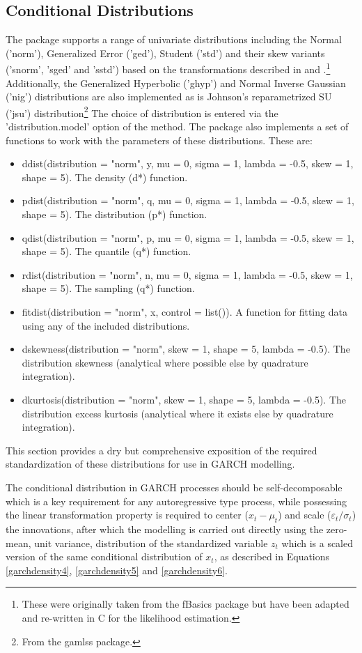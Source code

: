 \subsection{Conditional Distributions}\label{section:distributions}
The \verb@rugarch@ package supports a range of univariate distributions
including the Normal ('norm'), Generalized Error ('ged'), Student ('std')
and their skew variants ('snorm', 'sged' and 'sstd') based on the transformations
described in \citet{Fernandez1} and \citet{Ferreira1}.\footnote{These were
originally taken from the fBasics package  but have been adapted and re-written
in C for the likelihood estimation.} Additionally, the Generalized Hyperbolic
('ghyp') and Normal Inverse Gaussian ('nig') distributions are also implemented
as is Johnson's reparametrized SU ('jsu') distribution\footnote{From the
gamlss package.} The choice of distribution is entered via the
'distribution.model' option of the \verb@ugarchspec@ method. The package also
implements a set of functions to work with the parameters of these distributions.
These are:
\begin{itemize}
\item ddist(distribution = "norm", y, mu = 0, sigma = 1, lambda = -0.5, skew = 1, shape = 5). The density (d*) function.
\item pdist(distribution = "norm", q, mu = 0, sigma = 1, lambda = -0.5, skew = 1, shape = 5). The distribution (p*) function.
\item qdist(distribution = "norm", p, mu = 0, sigma = 1, lambda = -0.5, skew = 1, shape = 5). The quantile (q*) function.
\item rdist(distribution = "norm", n, mu = 0, sigma = 1, lambda = -0.5, skew = 1, shape = 5). The sampling (q*) function.
\item fitdist(distribution = "norm", x, control = list()). A function for fitting data using any of the included distributions.
\item dskewness(distribution = "norm", skew = 1, shape = 5, lambda = -0.5). The distribution skewness (analytical where possible else by quadrature integration).
\item dkurtosis(distribution = "norm", skew = 1, shape = 5, lambda = -0.5). The distribution excess kurtosis (analytical where it exists else by quadrature integration).
\end{itemize}
This section provides a dry but comprehensive exposition of the required
standardization of these distributions for use in GARCH modelling.

The conditional distribution in GARCH processes should be self-decomposable
which is a key requirement for any autoregressive type process, while
possessing the linear transformation property is required to center ($x_t-\mu_t$)
and scale ($\varepsilon_t/\sigma_t$) the innovations, after which the modelling
is carried out directly using the zero-mean, unit variance, distribution of the
standardized variable $z_t$ which is a scaled version of the same conditional
distribution of $x_t$, as described in Equations \ref{garchdensity4},
\ref{garchdensity5} and \ref{garchdensity6}.


